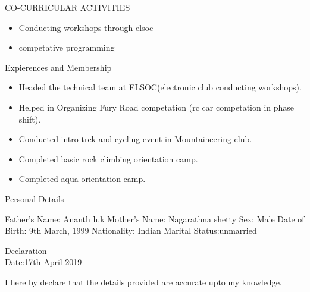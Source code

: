 \documentclass[10pt]{article}
\begin{document}
		
	\begin{minipage}[t][2cm][t]{0.2\textwidth}
		CO-CURRICULAR ACTIVITIES
		
	\end{minipage}
	\begin{minipage}[t][2cm][t]{0.8\textwidth}
		\begin{itemize}
		\item Conducting workshops through elsoc
		\item competative programming
	
	\end{itemize}
		
	\end{minipage}



		\begin{minipage}[t][2cm][t]{0.2\textwidth}
		Expierences and Membership
		
	\end{minipage}
	\begin{minipage}[t][2cm][t]{0.8\textwidth}
		\begin{itemize}
			\item Headed the technical team at ELSOC(electronic club conducting workshops).
			\item Helped in Organizing Fury Road competation (rc car competation in phase shift).
			\item Conducted intro trek and cycling event in Mountaineering club.
			\item Completed basic rock climbing orientation camp.
			\item Completed aqua orientation camp.
			
		\end{itemize}
		
	\end{minipage}


		
	\begin{minipage}[t][3cm][t]{0.2\textwidth}
		Personal Details
		
	\end{minipage}
	\begin{minipage}[t][3cm][t]{0.8\textwidth}
		Father's Name: Ananth h.k
		\newline Mother's Name: Nagarathna shetty
		\newline Sex: Male
		\newline Date of Birth: 9th March, 1999
		\newline Nationality: Indian
		\newline Marital Status:unmarried
		
	\end{minipage}

	
		\begin{minipage}[t][2cm][t]{0.2\textwidth}
		Declaration
		\\
		Date:17th April 2019 
		
	\end{minipage}
	\begin{minipage}[t][2cm][t]{0.8\textwidth}
		I here by declare that the details provided are accurate upto my knowledge.
		
	\end{minipage}


	

	
	
\end{document}

